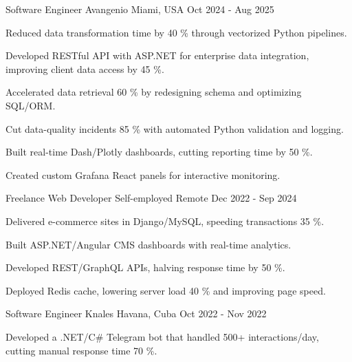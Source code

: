 \documentclass[]{awesome-cv}
\begin{document}
\begin{cventries}
  \cventry
    {Software Engineer}
    {Avangenio}
    {Miami, USA}
    {Oct 2024 - Aug 2025}
    {\begin{cvitems}
        \item Reduced data transformation time by 40 \% through vectorized Python pipelines.
        \item Developed RESTful API with ASP.NET for enterprise data integration, improving client data access by 45 \%.
        \item Accelerated data retrieval 60 \% by redesigning schema and optimizing SQL/ORM.
        \item Cut data-quality incidents 85 \% with automated Python validation and logging.
        \item Built real-time Dash/Plotly dashboards, cutting reporting time by 50 \%.
        \item Created custom Grafana React panels for interactive monitoring.
      \end{cvitems}}

  \cventry
    {Freelance Web Developer}
    {Self-employed}
    {Remote}
    {Dec 2022 - Sep 2024}
    {\begin{cvitems}
        \item Delivered e-commerce sites in Django/MySQL, speeding transactions 35 \%.
        \item Built ASP.NET/Angular CMS dashboards with real-time analytics.
        \item Developed REST/GraphQL APIs, halving response time by 50 \%.
        \item Deployed Redis cache, lowering server load 40 \% and improving page speed.
      \end{cvitems}}

  \cventry
    {Software Engineer}
    {Knales}
    {Havana, Cuba}
    {Oct 2022 - Nov 2022}
    {\begin{cvitems}
        \item Developed a .NET/C\# Telegram bot that handled 500+ interactions/day, cutting manual response time 70 \%.
      \end{cvitems}}
\end{cventries}
\end{document}
